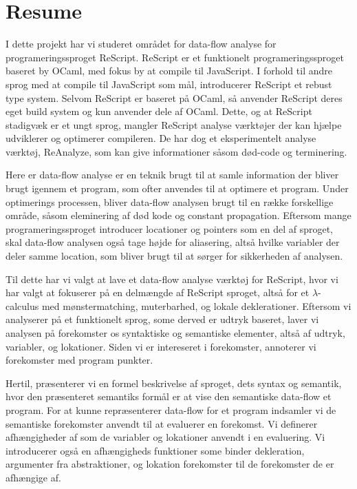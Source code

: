 \documentclass[../master.tex]{subfiles}
\begin{document}
\section{Resume}
I dette projekt har vi studeret området for data-flow analyse for programeringssproget ReScript.
ReScript er et funktionelt programeringssproget baseret by OCaml, med fokus by at compile til JavaScript.
I forhold til andre sprog med at compile til JavaScript som mål, introducerer ReScript et rebust type system.
Selvom ReScript er baseret på OCaml, så anvender ReScript deres eget build system og kun anvender dele af OCaml.
Dette, og at ReScript stadigvæk er et ungt sprog, mangler ReScript analyse værktøjer der kan hjælpe udviklerer og optimerer compileren.
De har dog et eksperimentelt analyse værktøj, ReAnalyze, som kan give informationer såsom død-code og terminering.

Here er data-flow analyse er en teknik brugt til at samle information der bliver brugt igennem et program, som ofter anvendes til at optimere et program.
Under optimerings processen, bliver data-flow analysen brugt til en række forskellige område, såsom eleminering af død kode og constant propagation.
Eftersom mange programeringssproget introducer locationer og pointers som en del af sproget, skal data-flow analysen også tage højde for aliasering, altså hvilke variabler der deler samme location, som bliver brugt til at sørger for sikkerheden af analysen.
\bigskip

Til dette har vi valgt at lave et data-flow analyse værktøj for ReScript, hvor vi har valgt at fokuserer på en delmængde af ReScript sproget, altså for et $\lambda$-calculus med mønstermatching, muterbarhed, og lokale deklerationer.
Eftersom vi analyserer på et funktionelt sprog, some derved er udtryk baseret, laver vi analysen på forekomster os syntaktiske og semantiske elementer, altså af udtryk, variabler, og lokationer.
Siden vi er intereseret i forekomster, annoterer vi forekomster med program punkter.

Hertil, præsenterer vi en formel beskrivelse af sproget, dets syntax og semantik, hvor den præsenteret semantiks formål er at vise den semantiske data-flow et program.
For at kunne repræsenterer data-flow for et program indsamler vi de semantiske forekomster anvendt til at evaluerer en forekomst.
Vi definerer afhængigheder af som de variabler og lokationer anvendt i en evaluering.
Vi introducerer også en afhængigheds funktioner some binder dekleration, argumenter fra abstraktioner, og lokation forekomster til de forekomster de er afhængige af.
\end{document}
